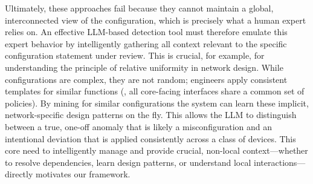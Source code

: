 Ultimately, these approaches fail because they cannot maintain a global, interconnected view of the configuration, which is precisely what a human expert relies on. An effective LLM-based detection tool must therefore emulate this expert behavior by intelligently gathering all context relevant to the specific configuration statement under review. This is crucial, for example, for understanding the principle of relative uniformity in network design. While configurations are complex, they are not random; engineers apply consistent templates for similar functions (\eg, all core-facing interfaces share a common set of policies). By mining for similar configurations the system can learn these implicit, network-specific design patterns on the fly. This allows the LLM to distinguish between a true, one-off anomaly that is likely a misconfiguration and an intentional deviation that is applied consistently across a class of devices. This core need to intelligently manage and provide crucial, non-local context—whether to resolve dependencies, learn design patterns, or understand local interactions—directly motivates our framework.